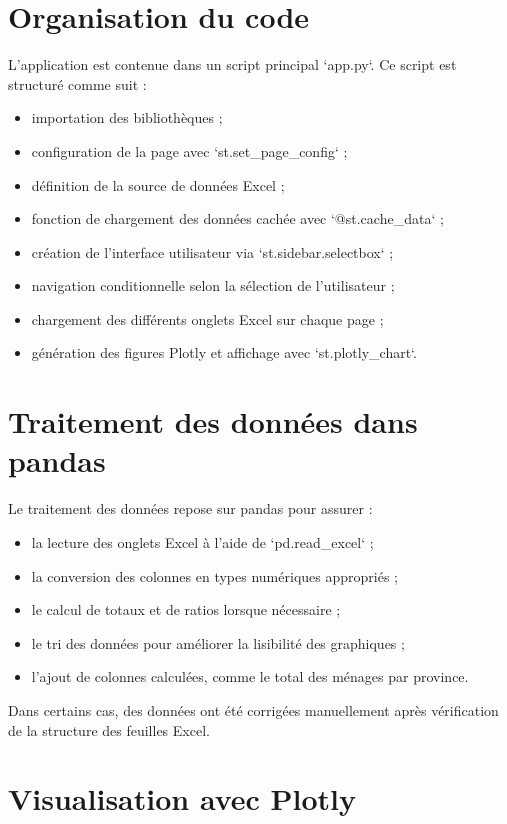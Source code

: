 \documentclass[12pt,a4paper,oneside]{report}
\begin{document}
\section{Organisation du code}

L'application est contenue dans un script principal `app.py`. Ce script est structuré comme suit :

\begin{itemize}[leftmargin=*]
  \item importation des bibliothèques ;
  \item configuration de la page avec `st.set_page_config` ;
  \item définition de la source de données Excel ;
  \item fonction de chargement des données cachée avec `@st.cache_data` ;
  \item création de l'interface utilisateur via `st.sidebar.selectbox` ;
  \item navigation conditionnelle selon la sélection de l'utilisateur ;
  \item chargement des différents onglets Excel sur chaque page ;
  \item génération des figures Plotly et affichage avec `st.plotly_chart`.
\end{itemize}

\section{Traitement des données dans pandas}

Le traitement des données repose sur pandas pour assurer :

\begin{itemize}[leftmargin=*]
  \item la lecture des onglets Excel à l'aide de `pd.read_excel` ;
  \item la conversion des colonnes en types numériques appropriés ;
  \item le calcul de totaux et de ratios lorsque nécessaire ;
  \item le tri des données pour améliorer la lisibilité des graphiques ;
  \item l'ajout de colonnes calculées, comme le total des ménages par province.
\end{itemize}

Dans certains cas, des données ont été corrigées manuellement après vérification de la structure des feuilles Excel.

\section{Visualisation avec Plotly}
\end{document}
